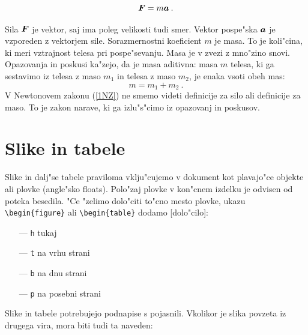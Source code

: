 \begin{equation}
{\hbox{\boldmath{$F$}}} = m {\hbox{\boldmath{$a$}}} \> .
\label{1NZ}
\end{equation}

Sila ${\hbox{\boldmath{$F$}}}$ je vektor, saj ima poleg velikosti tudi smer. 
Vektor pospe"ska ${\hbox{\boldmath{$a$}}}$ je vzporeden z vektorjem sile. 
Sorazmernostni koeficient  $m$ je masa.  To je koli"cina, 
ki meri vztrajnost telesa pri pospe"sevanju. Masa je v zvezi 
z mno"zino snovi.  Opazovanja in poskusi ka"zejo, da je masa aditivna: 
masa $m$ telesa, ki ga sestavimo iz telesa z maso $m_1$ in telesa 
z maso $m_2$, je enaka vsoti obeh mas:
$$
m = m_1 + m_2 \>.
$$
V Newtonovem zakonu (\ref{1NZ}) ne smemo videti definicije 
za silo ali definicije za maso. To je zakon narave, ki ga 
izlu"s"cimo iz opazovanj in poskusov.

%

\chapter{Slike in tabele}
\label{ch3}

Slike in dalj"se tabele praviloma vklju"cujemo v dokument kot 
plavajo"ce objekte ali plovke (angle"sko floats).
Polo"zaj plovke v kon"cnem izdelku je odvisen od poteka besedila.
"Ce "zelimo dolo"citi to"cno mesto plovke, ukazu \verb|\begin{figure}|
ali \verb|\begin{table}| dodamo [dolo"cilo]:

\begin{itemize}
\item[---]{{\tt h} \hspace{1 cm} tukaj}
\item[---]{{\tt t} \hspace{1 cm} na vrhu strani}
\item[---]{{\tt b} \hspace{1 cm} na dnu strani}
\item[---]{{\tt p} \hspace{1 cm} na posebni strani}
\end{itemize}

\noindent
Slike in tabele potrebujejo podnapise s pojasnili. Vkolikor je slika povzeta iz drugega vira, mora biti tudi ta naveden:

